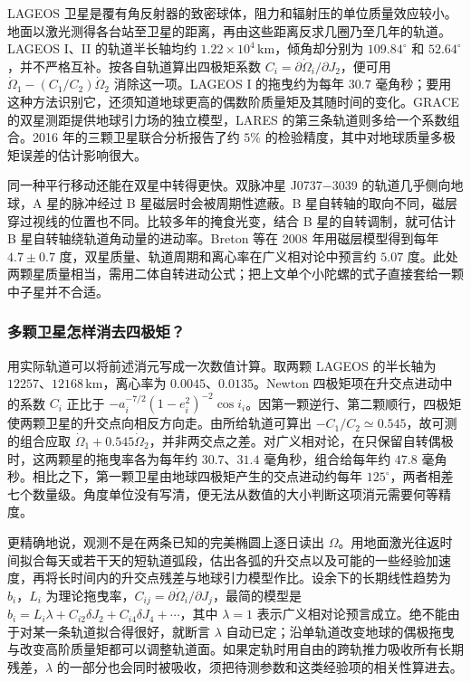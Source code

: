 LAGEOS 卫星是覆有角反射器的致密球体，阻力和辐射压的单位质量效应较小。地面以激光测得各台站至卫星的距离，再由这些距离反求几圈乃至几年的轨道。LAGEOS I、II 的轨道半长轴均约 $1.22\times10^4\,\mathrm{km}$，倾角却分别为 $109.84^\circ$ 和 $52.64^\circ$，并不严格互补。按各自轨道算出四极矩系数 $C_i=\partial\dot\Omega_i/\partial J_2$，便可用 $\dot\Omega_1-(C_1/C_2)\dot\Omega_2$ 消除这一项。LAGEOS I 的拖曳约为每年 $30.7$ 毫角秒；要用这种方法识别它，还须知道地球更高的偶数阶质量矩及其随时间的变化。GRACE 的双星测距提供地球引力场的独立模型，LARES 的第三条轨道则多给一个系数组合。2016 年的三颗卫星联合分析报告了约 $5\%$ 的检验精度，其中对地球质量多极矩误差的估计影响很大。

同一种平行移动还能在双星中转得更快。双脉冲星 J0737$-$3039 的轨道几乎侧向地球，A 星的脉冲经过 B 星磁层时会被周期性遮蔽。B 星自转轴的取向不同，磁层穿过视线的位置也不同。比较多年的掩食光变，结合 B 星的自转调制，就可估计 B 星自转轴绕轨道角动量的进动率。Breton 等在 2008 年用磁层模型得到每年 $4.7\pm0.7$ 度，双星质量、轨道周期和离心率在广义相对论中预言约 $5.07$ 度。此处两颗星质量相当，需用二体自转进动公式；把上文单个小陀螺的式子直接套给一颗中子星并不合适。

\subsubsection{多颗卫星怎样消去四极矩？}

用实际轨道可以将前述消元写成一次数值计算。取两颗 LAGEOS 的半长轴为 $12257$、$12168\,\mathrm{km}$，离心率为 $0.0045$、$0.0135$。Newton 四极矩项在升交点进动中的系数 $C_i$ 正比于 $-a_i^{-7/2}(1-e_i^2)^{-2}\cos i_i$。因第一颗逆行、第二颗顺行，四极矩使两颗卫星的升交点向相反方向走。由所给轨道可算出 $-C_1/C_2\simeq0.545$，故可测的组合应取 $\dot\Omega_1+0.545\dot\Omega_2$，并非两交点之差。对广义相对论，在只保留自转偶极时，这两颗星的拖曳率各为每年约 $30.7$、$31.4$ 毫角秒，组合给每年约 $47.8$ 毫角秒。相比之下，第一颗卫星由地球四极矩产生的交点进动约每年 $125^\circ$，两者相差七个数量级。角度单位没有写清，便无法从数值的大小判断这项消元需要何等精度。

更精确地说，观测不是在两条已知的完美椭圆上逐日读出 $\Omega$。用地面激光往返时间拟合每天或若干天的短轨道弧段，估出各弧的升交点以及可能的一些经验加速度，再将长时间内的升交点残差与地球引力模型作比。设余下的长期线性趋势为 $b_i$，$L_i$ 为理论拖曳率，$C_{ij}=\partial\dot\Omega_i/\partial J_j$，最简的模型是 $b_i=L_i\lambda+C_{i2}\delta J_2+C_{i4}\delta J_4+\cdots$，其中 $\lambda=1$ 表示广义相对论预言成立。绝不能由于对某一条轨道拟合得很好，就断言 $\lambda$ 自动已定；沿单轨道改变地球的偶极拖曳与改变高阶质量矩都可以调整轨道面。如果定轨时用自由的跨轨推力吸收所有长期残差，$\lambda$ 的一部分也会同时被吸收，须把待测参数和这类经验项的相关性算进去。

